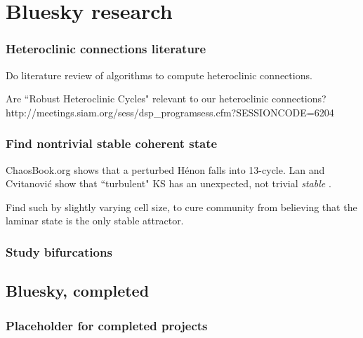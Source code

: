 
\chapter{Bluesky research}
\label{bluesky}


\subsection{Heteroclinic connections literature}

Do literature review of algorithms to
compute heteroclinic connections.

Are ``Robust Heteroclinic Cycles" relevant to our heteroclinic connections?
\\
http://meetings.siam.org/sess/dsp\_programsess.cfm?SESSIONCODE=6204

\subsection{Find nontrivial stable coherent state}

ChaosBook.org shows that a perturbed H\'enon falls into 13-cycle.
Lan and Cvitanovi{\'c} show that ``turbulent" KS has an
unexpected, not trivial {\em stable} \eqv.

Find such by slightly varying cell size,
to cure community from believing that
the laminar state is the only stable attractor.

\subsection{Study bifurcations}


\section{Bluesky, completed}

\subsection{Placeholder for completed projects}
